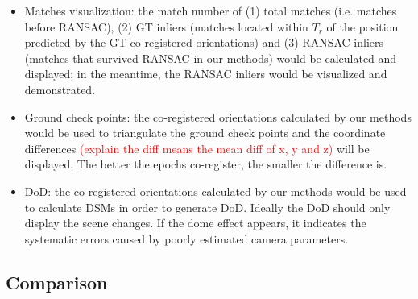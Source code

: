 \begin{itemize}
    \item Matches visualization: the match number of (1) total matches (i.e. matches before RANSAC), (2) GT inliers (matches located within $T_r$ of the position predicted by the GT co-registered orientations) and (3) RANSAC inliers (matches that survived RANSAC in our methods) would be calculated and displayed; in the meantime, the RANSAC inliers would be visualized and demonstrated.
    \item Ground check points: the co-registered orientations calculated by our methods would be used to triangulate the ground check points and the coordinate differences \textcolor{red}{(explain the diff means the mean diff of x, y and z)} will be displayed. The better the epochs co-register, the smaller the difference is.
    \item DoD: the co-registered orientations calculated by our methods would be used to calculate DSMs in order to generate DoD. Ideally the DoD should only display the scene changes. If the dome effect appears, it indicates the systematic errors caused by poorly estimated camera parameters.   
\end{itemize}

\subsection{Comparison}

